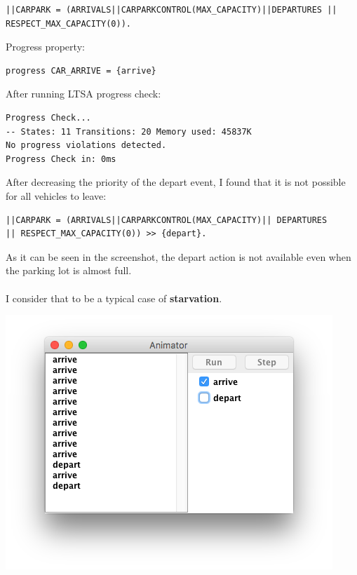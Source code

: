 \documentclass{article}
\begin{document}
\begin{enumerate}
\begin{enumerate}
\begin{verbatim}
||CARPARK = (ARRIVALS||CARPARKCONTROL(MAX_CAPACITY)||DEPARTURES || RESPECT_MAX_CAPACITY(0)).
\end{verbatim}
Progress property:
\begin{verbatim}
progress CAR_ARRIVE = {arrive}
\end{verbatim}

After running LTSA progress check:

\begin{verbatim}
Progress Check...
-- States: 11 Transitions: 20 Memory used: 45837K
No progress violations detected.
Progress Check in: 0ms
\end{verbatim}

After decreasing the priority of the depart event, I found that it is not possible for all vehicles to leave:

\begin{verbatim}
||CARPARK = (ARRIVALS||CARPARKCONTROL(MAX_CAPACITY)|| DEPARTURES 
|| RESPECT_MAX_CAPACITY(0)) >> {depart}.
\end{verbatim}

As it can be seen in the screenshot, the depart action is not available even when the parking lot is almost full. \\
\\
I consider that to be a typical case of \textbf{starvation}.

\includegraphics[scale=0.5]{img1.png}

\end{enumerate}


\end{enumerate}
\end{document}
